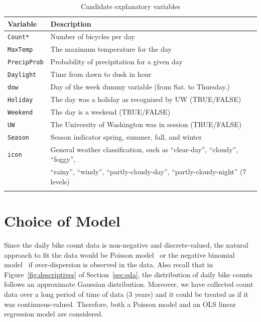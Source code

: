 \documentclass [11pt, proquest] {uwthesis}[2015/03/03]
\begin{document}
\begin{table}
\begin{center}
\caption{Candidate explanatory variables}
\vspace{10pt}
\begin{tabular}{l l} 
 \hline
Variable & Description \\
\hline
\texttt{Count*} & Number of bicycles per day \\
\texttt{MaxTemp} & The maximum temperature for the day \\
\texttt{PrecipProb} & Probability of precipitation for a given day \\
\texttt{Daylight} & Time from dawn to dusk in hour\\
\texttt{dow} & Day of the week dummy variable (from Sat. to Thursday.) \\
\texttt{Holiday} & The day was a holiday as recognized by UW (TRUE/FALSE) \\
\texttt{Weekend} & The day is a weekend (TRUE/FALSE) \\
\texttt{UW} & The University of Washington was in session (TRUE/FALSE) \\
\texttt{Season} & Season indicator spring, summer, fall, and winter \\
\texttt{icon} & General weather classification, such as ``clear-day'', ``cloudy'', ``foggy'', \\
 & ``rainy'', ``windy'', ``partly-cloudy-day'', ``partly-cloudy-night'' (7 levels)\\
\hline
\label{tb:variables}
\end{tabular}
\end{center}
\end{table}



\section{Choice of Model}
\label{sec:choiceofmodel}

Since the daily bike count data is non-negative and discrete-valued, the natural approach to fit the data would be Poisson model~\cite{Niemeier:1996aa} or the negative binomial model~\cite{PeterWeiran16} if over-dispersion is observed in the data. Also recall that in Figure~\ref{fig:descriptives} of Section~\ref{sec:eda}, the distribution of daily bike counts follows an approximate Gaussian distribution. Moreover, we have collected count data over a long period of time of data (3 years) and it could be treated as if it was continuous-valued. Therefore, both a Poisson model and an OLS linear regression model are considered.
\end{document}
